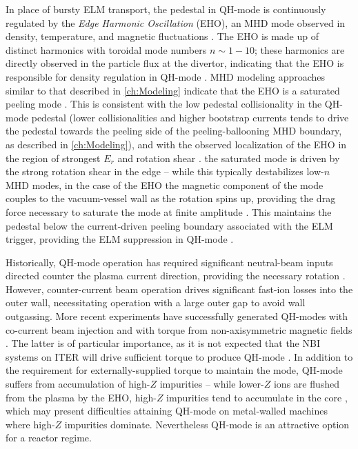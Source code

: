 In place of bursty ELM transport, the pedestal in QH-mode is continuously regulated by the \emph{Edge Harmonic Oscillation} (EHO), an MHD mode observed in density, temperature, and magnetic fluctuations \cite{Burrell2002}.  The EHO is made up of distinct harmonics with toroidal mode numbers $n \sim 1-10$; these harmonics are directly observed in the particle flux at the divertor, indicating that the EHO is responsible for density regulation in QH-mode \cite{Doyle2001}.  MHD modeling approaches similar to that described in \cref{ch:Modeling} indicate that the EHO is a saturated peeling mode \cite{Snyder2007,Osborne2008,Snyder2012}.  This is consistent with the low pedestal collisionality in the QH-mode pedestal (lower collisionalities and higher bootstrap currents tends to drive the pedestal towards the peeling side of the peeling-ballooning MHD boundary, as described in \cref{ch:Modeling}), and with the observed localization of the EHO in the region of strongest $E_r$ and rotation shear \cite{Burrell2001}.  
the saturated mode is driven by the strong rotation shear in the edge -- while this typically destabilizes low-$n$ MHD modes, in the case of the EHO the magnetic component of the mode couples to the vacuum-vessel wall as the rotation spins up, providing the drag force necessary to saturate the mode at finite amplitude \cite{Burrell2009}.  This maintains the pedestal below the current-driven peeling boundary associated with the ELM trigger, providing the ELM suppression in QH-mode \cite{Snyder2012}.

Historically, QH-mode operation has required significant neutral-beam inputs directed counter the plasma current direction, providing the necessary rotation \cite{Burrell2002}.  However, counter-current beam operation drives significant fast-ion losses into the outer wall, necessitating operation with a large outer gap to avoid wall outgassing.  More recent experiments have successfully generated QH-modes with co-current beam injection \cite{Burrell2009} and with torque from non-axisymmetric magnetic fields \cite{Garofalo2011,Burrell2013}.  The latter is of particular importance, as it is not expected that the NBI systems on ITER will drive sufficient torque to produce QH-mode \cite{Garofalo2011}.  In addition to the requirement for externally-supplied torque to maintain the mode, QH-mode suffers from accumulation of high-$Z$ impurities -- while lower-$Z$ ions are flushed from the plasma by the EHO, high-$Z$ impurities tend to accumulate in the core \cite{Doyle2001,Suttrop2005}, which may present 
difficulties attaining QH-mode on metal-walled machines where high-$Z$ impurities dominate.  Nevertheless QH-mode is an attractive option for a reactor regime.

